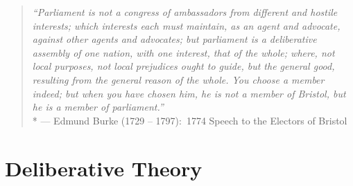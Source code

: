 
\begin{quotation}
	\emph{``Parliament is not a congress of ambassadors from different and hostile interests;
	which interests each must maintain, as an agent and advocate, against other agents and advocates;
	but parliament is a deliberative assembly of one nation, with one interest, that of the whole;
	where, not local purposes, not local prejudices ought to guide, but the general good, resulting from the general reason of the whole.
	You choose a member indeed;
	but when you have chosen him, he is not a member of Bristol, but he is a member of parliament.''}
	\\*
	--- Edmund Burke (1729 -- 1797):\ 1774 Speech to the Electors of Bristol \citep[as cited in][]{Burke1886}
\end{quotation}


\section{Deliberative Theory}




